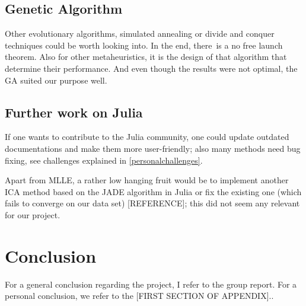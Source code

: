 \documentclass[journal, a4paper]{IEEEtran}
\begin{document}
\subsection{Genetic Algorithm}

Other evolutionary algorithms, simulated annealing or divide and conquer techniques could be worth looking into. In the end, there is a no free launch theorem. Also for other metaheuristics, it is the design of that algorithm that determine their performance. And even though the results were not optimal, the GA suited our purpose well.


\subsection{Further work on Julia}

If one wants to contribute to the Julia community, one could update outdated documentations and make them more user-friendly; also many methods need bug fixing, see challenges explained in \ref{personalchallenges}. 

Apart from MLLE, a rather low hanging fruit would be to implement another ICA method based on the JADE algorithm in Julia or fix the existing one (which fails to converge on our data set) [REFERENCE]; this did not seem any relevant for our project.


\section{Conclusion}
For a general conclusion regarding the project, I refer to the group report. For a personal conclusion, we refer to the [FIRST SECTION OF APPENDIX]..

\newpage
\appendix 
\end{document}
